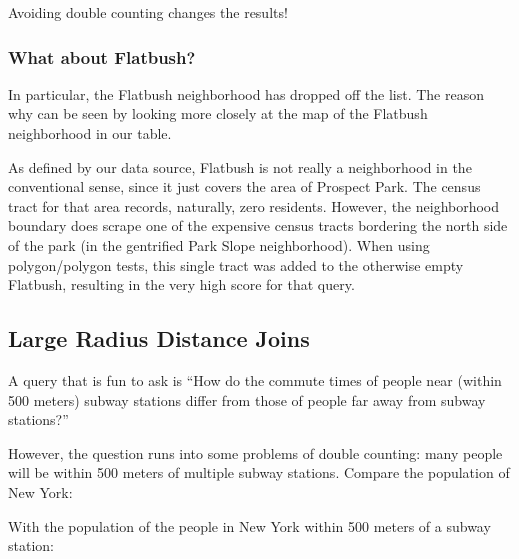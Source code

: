 \documentclass[a4paper,11pt,english]{sphinxmanual}
\begin{document}
Avoiding double counting changes the results!


\subsubsection{What about Flatbush?}
\label{\detokenize{advanced:what-about-flatbush}}
In particular, the Flatbush neighborhood has dropped off the list. The reason why can be seen by looking more closely at the map of the Flatbush neighborhood in our table.

\noindent{}

As defined by our data source, Flatbush is not really a neighborhood in the conventional sense, since it just covers the area of Prospect Park. The census tract for that area records, naturally, zero residents. However, the neighborhood boundary does scrape one of the expensive census tracts bordering the north side of the park (in the gentrified Park Slope neighborhood). When using polygon/polygon tests, this single tract was added to the otherwise empty Flatbush, resulting in the very high score for that query.


\subsection{Large Radius Distance Joins}
\label{\detokenize{advanced:large-radius-distance-joins}}\label{\detokenize{advanced:largeradiusjoins}}
A query that is fun to ask is “How do the commute times of people near (within 500 meters) subway stations differ from those of people far away from subway stations?”

However, the question runs into some problems of double counting: many people will be within 500 meters of multiple subway stations. Compare the population of New York:

\begin{sphinxVerbatim}[commandchars=\\\{\}]
 
 
\end{sphinxVerbatim}

\begin{sphinxVerbatim}[commandchars=\\\{\}]
\end{sphinxVerbatim}

With the population of the people in New York within 500 meters of a subway station:
\end{document}
